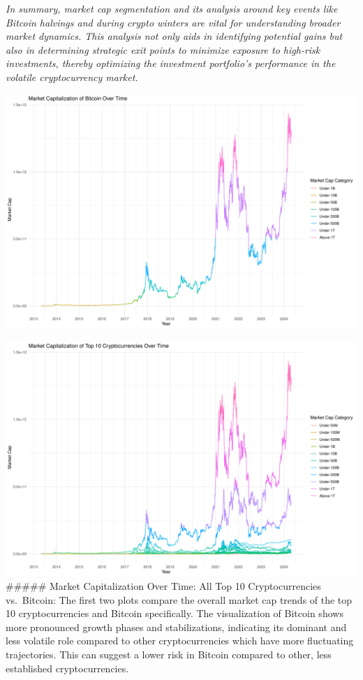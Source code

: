 \documentclass[
]{article}
\begin{document}
\emph{In summary, market cap segmentation and its analysis around key
events like Bitcoin halvings and during crypto winters are vital for
understanding broader market dynamics. This analysis not only aids in
identifying potential gains but also in determining strategic exit
points to minimize exposure to high-risk investments, thereby optimizing
the investment portfolio's performance in the volatile cryptocurrency
market.}

\includegraphics{Crypto_ETL_files/figure-latex/btc plot-1.pdf}

\includegraphics{Crypto_ETL_files/figure-latex/rank wise plots1-1.pdf}
\#\#\#\#\# Market Capitalization Over Time: All Top 10 Cryptocurrencies
vs.~Bitcoin: The first two plots compare the overall market cap trends
of the top 10 cryptocurrencies and Bitcoin specifically. The
visualization of Bitcoin shows more pronounced growth phases and
stabilizations, indicating its dominant and less volatile role compared
to other cryptocurrencies which have more fluctuating trajectories. This
can suggest a lower risk in Bitcoin compared to other, less established
cryptocurrencies.
\end{document}
